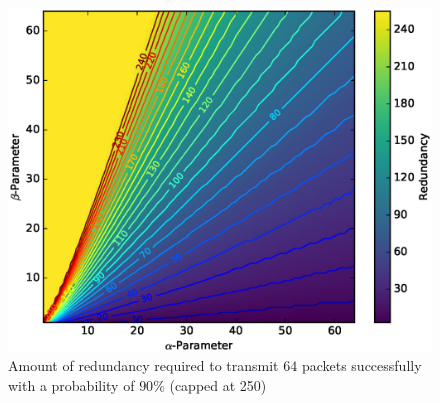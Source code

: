 \documentclass[10pt,a4paper]{article}
\begin{document}
\begin{figure}[h]
  \centering
  \includegraphics[width=\textwidth]{prediction/cdf-contour}
  \caption{Amount of redundancy required to transmit $64$ packets successfully with a probability of $90\%$ (capped at 250)}
  \label{fig:prediction:cdf-contour}
\end{figure}
\end{document}
